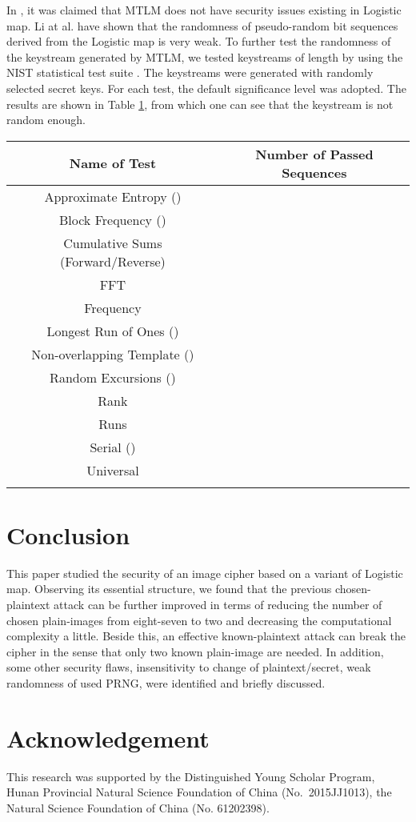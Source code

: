 \documentclass{ws-ijbc}
\begin{document}
\begin{itemize}
In \cite[Sec.~2.2]{Sam:TLM:MTA2012}, it was claimed
that MTLM does not have security
issues existing in Logistic map. Li at al.
\cite{Li:AttackingBitshiftXOR2007} have shown that the
randomness of pseudo-random bit sequences derived from
the Logistic map is very weak. To further test the
randomness of the keystream generated by MTLM, we tested  keystreams of
length  by using the NIST
statistical test suite \cite{Rukhin:TestPRNG:NIST10}.
The  keystreams were generated with randomly selected
secret keys. For each test, the default significance level
 was adopted. The results are shown in Table \ref{tab:random},
from which one can see that the keystream is not random enough.
\begin{table}[htbp]
{\begin{tabular}{c|c}
\toprule
Name of Test & Number of Passed Sequences \\\hline
Approximate Entropy () & \\\hline
Block Frequency () & \\\hline
Cumulative Sums (Forward/Reverse) & \\\hline
FFT & \\\hline
Frequency & \\\hline
Longest Run of Ones () & \\\hline
Non-overlapping Template () & \\\hline
Random Excursions () & \\\hline
Rank & \\\hline
Runs & \\\hline
Serial () & \\\hline
Universal & \\
\botrule
\end{tabular}}
\label{tab:random}
\end{table}

\end{itemize}

\section{Conclusion}

This paper studied the security of an image cipher
based on a variant of Logistic map. Observing its essential
structure, we found that the previous chosen-plaintext attack can be further improved in terms of reducing the number
of chosen plain-images from eight-seven to two and decreasing the computational complexity a little. Beside this,
an effective known-plaintext attack can break the cipher in the sense that only two known plain-image are needed. In addition, some other security flaws, insensitivity to change of plaintext/secret, weak randomness of used PRNG, were identified and briefly discussed.

\section*{Acknowledgement}

This research was supported by the Distinguished Young Scholar Program, Hunan Provincial Natural Science Foundation of China (No.~2015JJ1013), the Natural Science Foundation of China (No. 61202398).



\end{document}
